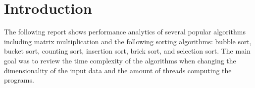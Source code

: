 \chapter{Introduction}

The following report shows performance analytics of several popular algorithms including matrix multiplication and 
the following sorting algorithms: bubble sort, bucket sort, counting sort, insertion sort, brick sort, and selection sort.
The main goal was to review the time complexity of the algorithms when changing the dimensionality of the input data and 
the amount of threads computing the programs.